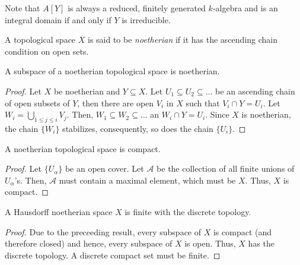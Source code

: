 \begin{remark}
    Note that $A[Y]$ is always a reduced, finitely generated $k$-algebra and is an integral domain if and only if $Y$ is irreducible.
\end{remark}

\begin{definition}
    A topological space $X$ is said to be \emph{noetherian} if it has the ascending chain condition on open sets.
\end{definition}

\begin{proposition}
    A subspace of a noetherian topological space is noetherian.
\end{proposition}
\begin{proof}
    Let $X$ be noetherian and $Y\subseteq X$. Let $U_1\subseteq U_2\subseteq\dots$ be an ascending chain of open subsets of $Y$, then there are open $V_i$ in $X$ such that $V_i\cap Y = U_i$. Let $W_i = \bigcup_{1\le j\le i} V_j$. Then, $W_1\subseteq W_2\subseteq\dots$ an $W_i\cap Y = U_i$. Since $X$ is noetherian, the chain $\{W_i\}$ stabilizes, consequently, so does the chain $\{U_i\}$.
\end{proof}

\begin{proposition}
    A noetherian topological space is compact.
\end{proposition}
\begin{proof}
    Let $\{U_\alpha\}$ be an open cover. Let $\mathscr A$ be the collection of all finite unions of $U_\alpha$'s. Then, $\mathscr A$ must contain a maximal element, which must be $X$. Thus, $X$ is compact.
\end{proof}

\begin{corollary}
    A Hausdorff noetherian space $X$ is finite with the discrete topology. 
\end{corollary}
\begin{proof}
    Due to the preceeding result, every subspace of $X$ is compact (and therefore closed) and hence, every subspace of $X$ is open. Thus, $X$ has the discrete topology. A discrete compact set must be finite.
\end{proof}

